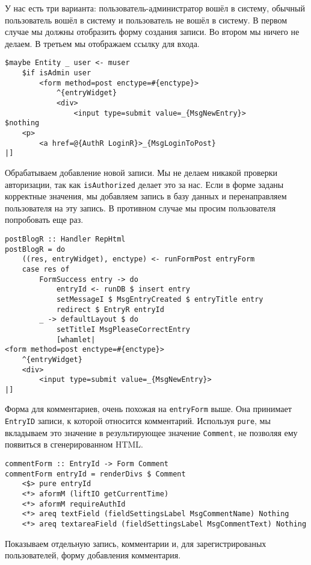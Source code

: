 У нас есть три варианта: пользователь-администратор вошёл в систему, обычный пользователь вошёл в систему и пользователь не вошёл в систему. В первом случае мы должны отобразить форму создания записи. Во втором мы ничего не делаем. В третьем мы отображаем ссылку для входа. 
 
\begin{lstlisting}
$maybe Entity _ user <- muser
    $if isAdmin user
        <form method=post enctype=#{enctype}>
            ^{entryWidget}
            <div>
                <input type=submit value=_{MsgNewEntry}>
$nothing
    <p>
        <a href=@{AuthR LoginR}>_{MsgLoginToPost}
|]
\end{lstlisting}%
 
Обрабатываем добавление новой записи. Мы не делаем никакой проверки авторизации, так как \lstinline!isAuthorized! делает это за нас. Если в форме заданы корректные значения, мы добавляем запись в базу данных и перенаправляем пользователя на эту запись. В противном случае мы просим пользователя попробовать еще раз. 
 
\begin{lstlisting}
postBlogR :: Handler RepHtml
postBlogR = do
    ((res, entryWidget), enctype) <- runFormPost entryForm
    case res of
        FormSuccess entry -> do
            entryId <- runDB $ insert entry
            setMessageI $ MsgEntryCreated $ entryTitle entry
            redirect $ EntryR entryId
        _ -> defaultLayout $ do
            setTitleI MsgPleaseCorrectEntry
            [whamlet|
<form method=post enctype=#{enctype}>
    ^{entryWidget}
    <div>
        <input type=submit value=_{MsgNewEntry}>
|]
\end{lstlisting}%
 
Форма для комментариев, очень похожая на \lstinline!entryForm! выше. Она принимает \lstinline!EntryID! записи, к которой относится комментарий. Используя \lstinline!pure!, мы вкладываем это значение в результирующее значение \lstinline!Comment!, не позволяя ему появиться в сгенерированном HTML. 
 
\begin{lstlisting}
commentForm :: EntryId -> Form Comment
commentForm entryId = renderDivs $ Comment
    <$> pure entryId
    <*> aformM (liftIO getCurrentTime)
    <*> aformM requireAuthId
    <*> areq textField (fieldSettingsLabel MsgCommentName) Nothing
    <*> areq textareaField (fieldSettingsLabel MsgCommentText) Nothing
\end{lstlisting}
 
Показываем отдельную запись, комментарии и, для зарегистрированых пользователей, форму добавления комментария.
 
